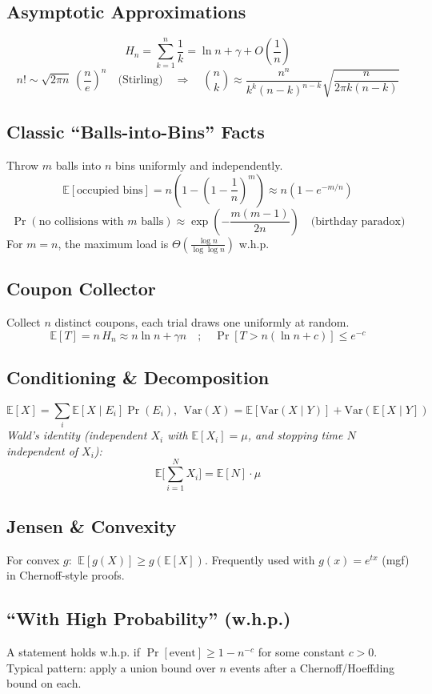 \documentclass[9pt]{extarticle}
\begin{document}
\subsection{Asymptotic Approximations}
\[
H_n=\sum_{k=1}^n \frac{1}{k}=\ln n+\gamma+O\!\left(\frac{1}{n}\right)
\]
\[
n!\sim \sqrt{2\pi n}\,\left(\frac{n}{e}\right)^n\quad\text{(Stirling)}\quad\Rightarrow\quad \binom{n}{k}\approx \frac{n^n}{k^k(n-k)^{n-k}}\sqrt{\frac{n}{2\pi k(n-k)}}
\]

\subsection{Classic “Balls-into-Bins” Facts}
Throw $m$ balls into $n$ bins uniformly and independently.
\[
\mathbb{E}[\text{occupied bins}] = n\left(1-\left(1-\frac{1}{n}\right)^{\!m}\right)\approx n\left(1-e^{-m/n}\right)
\]
\[
\Pr(\text{no collisions with }m\text{ balls})\approx \exp\!\left(-\frac{m(m-1)}{2n}\right)\quad\text{(birthday paradox)}
\]
For $m=n$, the maximum load is $\Theta\!\left(\frac{\log n}{\log\log n}\right)$ w.h.p.

\subsection{Coupon Collector}
Collect $n$ distinct coupons, each trial draws one uniformly at random.
\[
\mathbb{E}[T]=n\,H_n\approx n\ln n+\gamma n\quad;\quad \Pr\!\left[T>n(\ln n+c)\right]\le e^{-c}
\]

\subsection{Conditioning \& Decomposition}
\[
\mathbb{E}[X]=\sum_{i} \mathbb{E}[X\mid E_i]\Pr(E_i),\ \ \mathrm{Var}(X)=\mathbb{E}[\mathrm{Var}(X\mid Y)]+\mathrm{Var}(\mathbb{E}[X\mid Y])
\]
\emph{Wald’s identity (independent $X_i$ with $\mathbb{E}[X_i]=\mu$, and stopping time $N$ independent of $X_i$): }
\[
\mathbb{E}\Big[\sum_{i=1}^N X_i\Big]=\mathbb{E}[N]\cdot \mu
\]

\subsection{Jensen \& Convexity}
For convex $g$: $\ \mathbb{E}[g(X)]\ge g(\mathbb{E}[X])$. Frequently used with $g(x)=e^{tx}$ (mgf) in Chernoff-style proofs.

\subsection{“With High Probability” (w.h.p.)}
A statement holds w.h.p. if $\Pr[\text{event}]\ge 1 - n^{-c}$ for some constant $c>0$. Typical pattern: apply a union bound over $n$ events after a Chernoff/Hoeffding bound on each.
\end{document}
